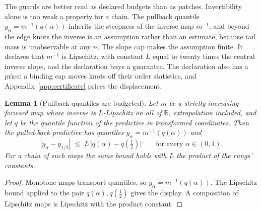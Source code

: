 \documentclass[11pt]{article}
\newtheorem{lemma}[proposition]{Lemma}
\theoremstyle{remark}
\begin{document}
The guards are better read as declared budgets than as patches. Invertibility alone is
too weak a property for a chain. The pullback quantile $y_\alpha = m^{-1}(q(\alpha))$
inherits the steepness of the inverse map $m^{-1}$, and beyond the edge knots the inverse
is an assumption rather than an estimate, because tail mass is unobservable at any $n$.
The slope cap makes the assumption finite. It declares that $m^{-1}$ is Lipschitz, with
constant $L$ equal to twenty times the central inverse slope, and the declaration buys a
guarantee. The declaration also has a price: a binding cap moves knots off their
order statistics, and Appendix~\ref{app:certificate} prices the displacement.

\begin{lemma}[Pullback quantiles are budgeted]\label{lem:budget}
Let $m$ be a strictly increasing forward map whose inverse is $L$-Lipschitz on all of $\mathbb{R}$,
extrapolation included, and let $q$ be the quantile function of the predictive in
transformed coordinates. Then the pulled-back predictive has quantiles
$y_\alpha = m^{-1}(q(\alpha))$ and
\[
  |y_\alpha - y_{1/2}| \;\le\; L\,\big|q(\alpha) - q(\tfrac12)\big|
  \qquad \text{for every } \alpha \in (0,1).
\]
For a chain of such maps the same bound holds with $L$ the product of the rungs'
constants.
\end{lemma}

\begin{proof}
Monotone maps transport quantiles, so $y_\alpha = m^{-1}(q(\alpha))$. The Lipschitz bound
applied to the pair $q(\alpha), q(\tfrac12)$ gives the display. A composition of
Lipschitz maps is Lipschitz with the product constant.
\end{proof}
\end{document}
